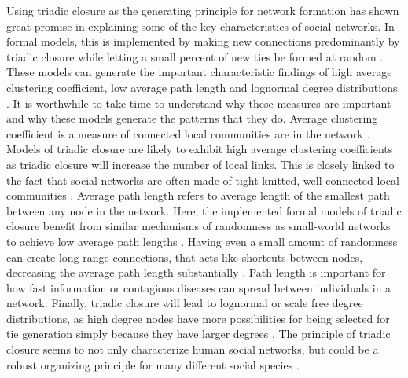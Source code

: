 \documentclass{article}
\begin{document}
Using triadic closure as the generating principle for network formation has shown great promise in explaining some of the key characteristics of social networks. In formal models, this is implemented by making new connections predominantly by triadic closure while letting a small percent of new ties be formed at random \cite{ilany_social_2016,jackson_search_2004,jackson_meeting_2007}. These models can generate the important characteristic findings of high average clustering coefficient, low average path length and lognormal degree distributions \cite{jackson_search_2004,jackson_meeting_2007}. 
It is worthwhile to take time to understand why these measures are important and why these models generate the patterns that they do. Average clustering coefficient is a measure of connected local communities are in the network \cite{watts_collective_1998}. Models of triadic closure are likely to exhibit high average clustering coefficients as triadic closure will increase the number of local links. This is closely linked to the fact that social networks are often made of tight-knitted, well-connected local communities \cite{peixoto_disentangling_2022}. Average path length refers to average length of the smallest path between any node in the network. Here, the implemented formal models of triadic closure benefit from similar mechanisms of randomness as small-world networks to achieve low average path lengths \cite{jackson_meeting_2007,watts_collective_1998}. Having even a small amount of randomness can create long-range connections, that acts like shortcuts between nodes, decreasing the average path length substantially \cite{watts_networks_1999}. Path length is important for how fast information or contagious diseases can spread between individuals in a network. Finally, triadic closure will lead to lognormal or scale free degree distributions, as high degree nodes have more possibilities for being selected for tie generation simply because they have larger degrees \cite{jackson_meeting_2007}. The principle of triadic closure seems to not only characterize human social networks, but could be a robust organizing principle for many different social species \cite{ilany_social_2016}. 
\end{document}

